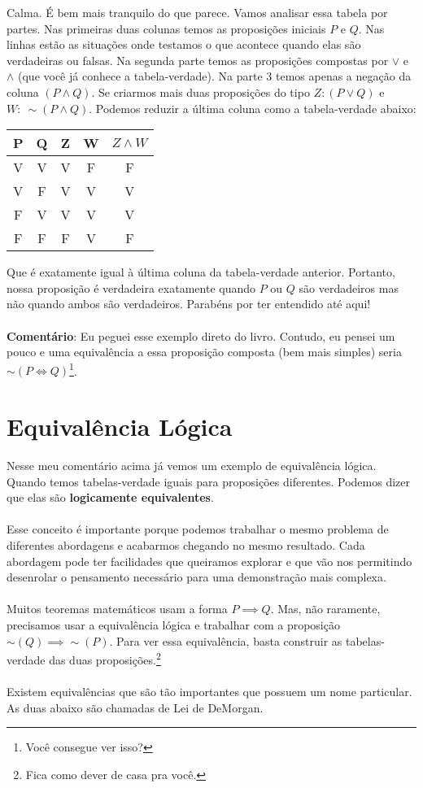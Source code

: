 \documentclass[a4paper,11pt]{book}
\theoremstyle{definition}
\theoremstyle{break}
\begin{document}
Calma. É bem mais tranquilo do que parece. Vamos analisar essa tabela por partes. Nas primeiras duas colunas temos as proposições iniciais $P$ e $Q$. Nas linhas estão as situações onde testamos o que acontece quando elas são verdadeiras ou falsas. Na segunda parte temos as proposições compostas por $\lor$ e $\land$ (que você já conhece a tabela-verdade). Na parte 3 temos apenas a negação da coluna $(P \land Q)$. Se criarmos mais duas proposições do tipo $Z : (P \lor Q)$ e $W : \  \sim(P \land Q)$. Podemos reduzir a última coluna como a tabela-verdade abaixo:

\begin{center}
\begin{tabular}{ | c c || c c || c | }
\hline
 P & Q & Z & W & $Z \land W$ \\ 
 \hline
 V & V & V & F & F \\  
 V & F & V & V & V \\  
 F & V & V & V & V \\  
 F & F & F & V & F \\
 \hline
\end{tabular}
\end{center}

Que é exatamente igual à última coluna da tabela-verdade anterior. Portanto, nossa proposição é verdadeira exatamente quando $P$ ou $Q$ são verdadeiros mas não quando ambos são verdadeiros. Parabéns por ter entendido até aqui!
\\
\\
\textbf{Comentário}: Eu peguei esse exemplo direto do livro. Contudo, eu pensei um pouco e uma equivalência a essa proposição composta (bem mais simples) seria $\sim(P \iff Q)$\footnote{Você consegue ver isso?}.

\section{Equivalência Lógica}

Nesse meu comentário acima já vemos um exemplo de equivalência lógica. Quando temos tabelas-verdade iguais para proposições diferentes. Podemos dizer que elas são \textbf{logicamente equivalentes}.
\\
\\
Esse conceito é importante porque podemos trabalhar o mesmo problema de diferentes abordagens e acabarmos chegando no mesmo resultado. Cada abordagem pode ter facilidades que queiramos explorar e que vão nos permitindo desenrolar o pensamento necessário para uma demonstração mais complexa.
\\
\\
Muitos teoremas matemáticos usam a forma $P \implies Q$. Mas, não raramente, precisamos usar a equivalência lógica e trabalhar com a proposição $\sim (Q) \implies \sim (P)$. Para ver essa equivalência, basta construir as tabelas-verdade das duas proposições.\footnote{Fica como dever de casa pra você.}
\\
\\
Existem equivalências que são tão importantes que possuem um nome particular. As duas abaixo são chamadas de Lei de DeMorgan.
\end{document}
